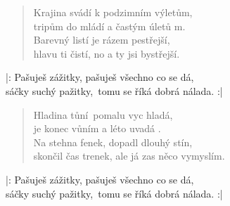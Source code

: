 \begin{song}{}
\begin{verse}
   Krajina svádí k podzimním výletům, \\
   tripům do mládí a častým úletů m. \\
   Barevný listí je rázem pestřejší, \\
   hlavu ti čistí, no a ty jsi bystřejší.
\end{verse}
\begin{refren}
   |: Pašuješ zážitky, pašuješ všechno co se dá,  \\
   sáčky suchý pažitky,~tomu se říká dobrá nálada. :|
\end{refren}
\begin{verse}
   Hladina tůní~pomalu vyc hladá, \\
   je konec vůním a léto uvadá . \\
   Na stehna fenek, dopadl dlouhý stín, \\
   skončil čas trenek, ale já zas něco vymyslím.
\end{verse}
\begin{refren}
   |: Pašuješ zážitky, pašuješ všechno co se dá,  \\
   sáčky suchý pažitky,~tomu se říká dobrá nálada. :|
\end{refren}
\begin{chords}
  \chordAsusTwo \chordCm \chordCsharpm \chordFsharpm \chordDsusTwo
\end{chords}
\end{song}
\pagebreak
